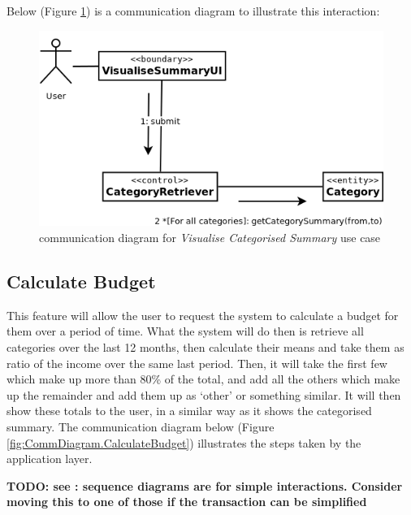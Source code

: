 Below (Figure \ref{fig:CommDiagram.VisualiseCategorisedSummary}) is a
communication diagram to illustrate this interaction: 
\begin{figure}[ht!]
  \begin{center}
    \includegraphics[width=12cm]{./contents/img/Comm_Diagram_-_Visualise_Categorised_Summary.png}
  \end{center}
  \caption{communication diagram for \emph{Visualise Categorised Summary} use case}
  \label{fig:CommDiagram.VisualiseCategorisedSummary}
\end{figure}
\FloatBarrier



\subsection{Calculate Budget} \label{sec:AnalysisAndDesign.CalculateBudget}
This feature will allow the user to request the system to calculate a budget
for them over a period of time. What the system will do then is retrieve all
categories over the last 12 months, then calculate their means and take them as
ratio of the income over the same last period. Then, it will take the first few
which make up more than 80\% of the total, and add all the others which make up
the remainder and add them up as `other' or something similar. It will then
show these totals to the user, in a similar way as it shows the categorised
summary. The communication diagram below (Figure
\ref{fig:CommDiagram.CalculateBudget}) illustrates the steps taken by the
application layer.

\textbf{TODO: see \cite[][p.~262]{bennett2010object}: sequence diagrams are for simple
interactions. Consider moving this to one of those if the transaction can be
simplified}

